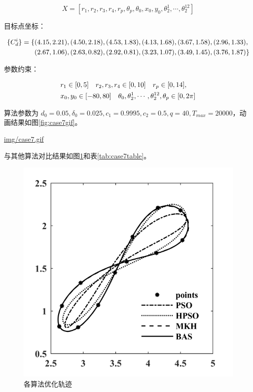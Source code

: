 \documentclass[]{ctexbook}
\theoremstyle{definition}
\theoremstyle{definition}
\theoremstyle{definition}
\theoremstyle{remark}
\begin{document}
\[
X = [r_1,r_2,r_3,r_4,r_p,\theta_p,\theta_0,x_0,y_0,\theta_2^1,\cdots,\theta_2^{12}]
\]

目标点坐标：

\begin{align}
\{C_d^i\} = \{&(4.15,2.21),(4.50,2.18),(4.53,1.83),(4.13,1.68),(3.67,1.58),(2.96,1.33), \notag \\
&(2.67,1.06),(2.63,0.82),(2.92,0.81),(3.23,1.07),(3.49,1.45),(3.76,1.87)\}\notag\\
\end{align}

参数约束：

\begin{align}
&r_1\in[0,5]\quad r_2,r_3,r_4\in[0,10] \quad r_p\in[0,14],\notag \\
&x_0,y_0\in[-80,80]\quad \theta_0,\theta_2^1,\cdots,\theta_2^{12},\theta_p\in[0,2\pi] \notag \\
\end{align}

算法参数为
\(d_0 = 0.05,\delta_0=0.025,c_1=0.9995,c_2=0.5,q=40,T_{max}=20000\)，动画结果如图\ref{fig:case7gif}。

\url{img/case7.gif}

与其他算法对比结果如图\ref{fig:case7png}和表\ref{tab:case7table}。

\begin{figure}

{\centering \includegraphics[width=0.5\linewidth]{img/case7png} 

}

\caption{各算法优化轨迹}\label{fig:case7png}
\end{figure}
\end{document}
